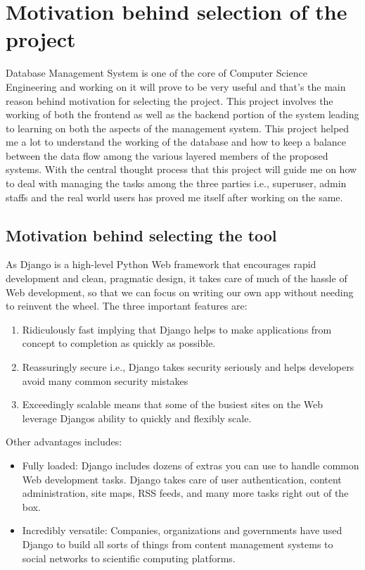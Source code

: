 \documentclass[12pt]{report}
\begin{document}
\section {Motivation behind selection of the project}
Database Management System is one of the core
of Computer Science Engineering and working
on it will prove to be very useful and that’s the
main reason behind motivation for selecting the
project. This project involves the working of both the frontend as well as the backend portion of the system leading to learning on both the aspects of the management system. This project helped me a lot to understand the working of the database and how to keep a balance between the data flow among the various layered members of the proposed systems. With the central thought process that this project will guide me on how to deal with managing the tasks among the three parties i.e., superuser, admin staffs and the real world users has proved me itself after working on the same.\newline

\subsection {Motivation behind selecting the tool}

As Django is a high-level Python Web
framework that encourages rapid development and clean, pragmatic design, it takes care of
much of the hassle of Web development, so that
we can focus on writing our own app without
needing to reinvent the wheel. \newline
The three important features are:
\begin{enumerate}
\item Ridiculously fast implying that Django helps
to make applications from concept to completion
as quickly as possible.
\item Reassuringly
secure i.e., Django takes security seriously and
helps developers avoid many common security
mistakes
\item Exceedingly scalable means
that some of the busiest sites on the Web
leverage Djangos ability to quickly and flexibly
scale.
\end{enumerate}

Other advantages includes:
\begin{itemize} 
\item Fully
loaded: Django includes dozens of extras you
can use to handle common Web development
tasks. Django takes care of user authentication,
content administration, site maps, RSS feeds,
and many more tasks
right out of the
box.
\item Incredibly
versatile:
Companies,
organizations and governments have used
Django to build all sorts of things from content
management systems to social networks to
scientific computing platforms.

\end{itemize}
\newpage
\end{document}
